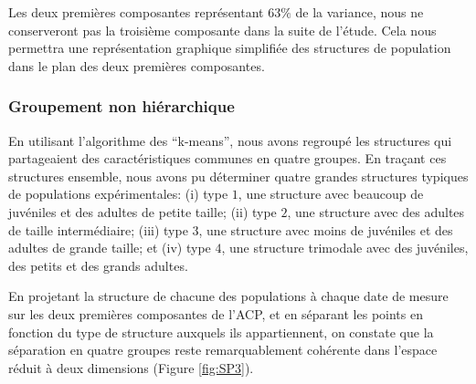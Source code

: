 Les deux premières composantes représentant $63\%$ de la variance, nous ne
conserveront pas la troisième composante dans la suite de l'étude. Cela nous
permettra une représentation graphique simplifiée des structures de population
dans le plan des deux premières composantes. 

\subsubsection{Groupement non hiérarchique}

En utilisant l'algorithme des ``k-means'', nous avons regroupé les structures
qui partageaient des caractéristiques communes en quatre groupes. En traçant ces
structures ensemble, nous avons pu déterminer quatre grandes structures typiques
de populations expérimentales: (i) type $1$, une structure avec beaucoup de
juvéniles et des adultes de petite taille; (ii) type $2$, une structure avec des
adultes de taille intermédiaire; (iii) type $3$, une structure avec moins de
juvéniles et des adultes de grande taille; et (iv) type $4$, une structure
trimodale avec des juvéniles, des petits et des grands adultes.

En projetant la structure de chacune des populations à chaque date de mesure
sur les deux premières composantes de l'ACP, et en séparant les points en
fonction du type de structure auxquels ils appartiennent, on constate que la
séparation en quatre groupes reste remarquablement cohérente dans l'espace
réduit à deux dimensions (Figure \ref{fig:SP3}). 

